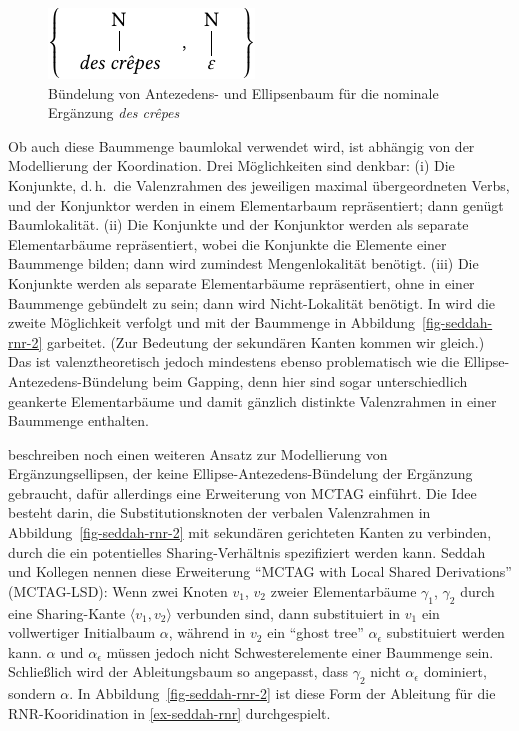 \begin{figure}[t]
\centering
\includegraphics{graphics/abb812.pdf}
\caption{\label{fig-seddah-rnr}Bündelung von Antezedens- und Ellipsenbaum für die nominale Ergänzung {\it des cr\^{e}pes}}
\end{figure}    
Ob auch diese Baummenge baumlokal verwendet wird, ist abhängig von der Modellierung der Koordination. Drei Möglichkeiten sind denkbar: (i) Die Konjunkte, d.\,h.\ die Valenzrahmen des jeweiligen maximal übergeordneten Verbs,  und der Konjunktor werden in einem Elementarbaum repräsentiert; dann genügt Baumlokalität. (ii) Die Konjunkte und der Konjunktor werden als separate Elementarbäume repräsentiert, wobei die Konjunkte die Elemente einer Baummenge bilden; dann wird zumindest Mengenlokalität benötigt. (iii) Die Konjunkte werden als separate Elementarbäume repräsentiert, ohne in einer Baummenge gebündelt zu sein; dann wird Nicht-Lokalität benötigt. In \citet[Figure~2]{Seddah:etal:10} wird die zweite Möglichkeit verfolgt und mit der Baummenge in Abbildung~\ref{fig-seddah-rnr-2} garbeitet. (Zur Bedeutung der sekundären Kanten kommen wir gleich.) Das ist valenztheoretisch jedoch mindestens ebenso problematisch wie die Ellipse-Antezedens-Bündelung beim Gapping, denn hier sind sogar unterschiedlich geankerte Elementarbäume und damit gänzlich distinkte Valenzrahmen in einer Baummenge enthalten.    

\cite{Seddah:etal:10} beschreiben noch einen weiteren Ansatz zur Modellierung von Ergänzungsellipsen, der keine Ellipse-Antezedens-Bündelung der Ergänzung gebraucht, dafür allerdings eine Erweiterung von MCTAG einführt. Die Idee besteht darin, die Substitutionsknoten der verbalen Valenzrahmen in Abbildung~\ref{fig-seddah-rnr-2} mit sekundären gerichteten Kanten zu verbinden, durch die ein potentielles Sharing-Verhältnis spezifiziert werden kann. Seddah und Kollegen nennen diese Erweiterung "`MCTAG with Local Shared Derivations"' (MCTAG-LSD): Wenn zwei Knoten $v_1$, $v_2$  zweier Elementarbäume $\gamma_1$, $\gamma_2$ durch eine Sharing-Kante $\langle v_1,v_2 \rangle$ verbunden sind, dann substituiert in $v_1$ ein vollwertiger Initialbaum $\alpha$, während in $v_2$ ein "`ghost tree"' $\alpha_\epsilon$ substituiert werden kann. $\alpha$ und $\alpha_\epsilon$ müssen jedoch nicht Schwesterelemente einer Baummenge sein. Schlie\ss lich wird der Ableitungsbaum so angepasst, dass $\gamma_2$ nicht $\alpha_\epsilon$ dominiert, sondern $\alpha$. In Abbildung~\ref{fig-seddah-rnr-2} ist diese Form der Ableitung für die RNR-Kooridination in \ref{ex-seddah-rnr}  durchgespielt. 

